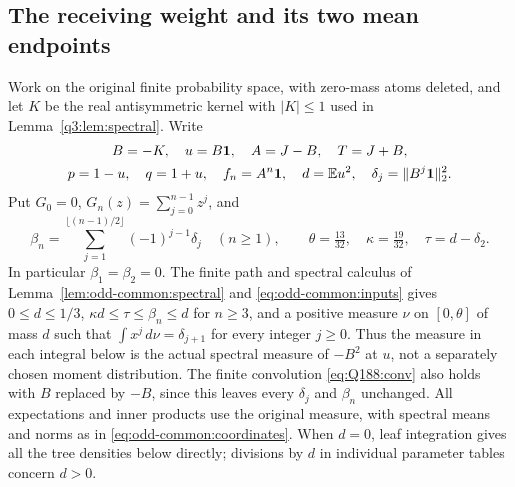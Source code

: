 \subsection{The receiving weight and its two mean endpoints}
\label{sec:reference-common:receiving}
Work on the original finite probability space, with zero-mass atoms
deleted, and let \(K\) be the real antisymmetric kernel with
\(|K|\le1\) used in Lemma~\ref{q3:lem:spectral}. Write
\[
 \begin{gathered}
 B=-K,\quad u=B\mathbf1,\quad A=J-B,\quad T=J+B,\\
 p=1-u,\quad q=1+u,\quad f_n=A^n\mathbf1,\quad
 d=\mathbb E u^2,\quad\delta_j=\|B^j\mathbf1\|_2^2.
 \end{gathered}
\]
Put \(G_0=0\), \(G_n(z)=\sum_{j=0}^{n-1}z^j\), and
\[
 \beta_n=\sum_{j=1}^{\lfloor(n-1)/2\rfloor}
             (-1)^{j-1}\delta_j\quad(n\ge1),\qquad
 \theta=\tfrac{13}{32},\quad\kappa=\tfrac{19}{32},\quad
 \tau=d-\delta_2.
\]
In particular \(\beta_1=\beta_2=0\). The finite path and spectral
calculus of Lemma~\ref{lem:odd-common:spectral} and
\eqref{eq:odd-common:inputs} gives \(0\le d\le1/3\),
\(\kappa d\le\tau\le\beta_n\le d\) for \(n\ge3\), and a
positive measure \(\nu\) on \([0,\theta]\) of mass \(d\) such that
\(\int x^j\,d\nu=\delta_{j+1}\) for every integer \(j\ge0\).
Thus the measure in each integral below is the actual spectral measure
of \(-B^2\) at \(u\), not a separately chosen moment distribution.
The finite convolution \eqref{eq:Q188:conv} also holds with \(B\)
replaced by \(-B\), since this leaves every \(\delta_j\) and
\(\beta_n\) unchanged. All expectations and inner products use the
original measure, with spectral means and norms as in
\eqref{eq:odd-common:coordinates}. When \(d=0\), leaf integration
gives all the tree densities below directly; divisions by \(d\) in
individual parameter tables concern \(d>0\).

